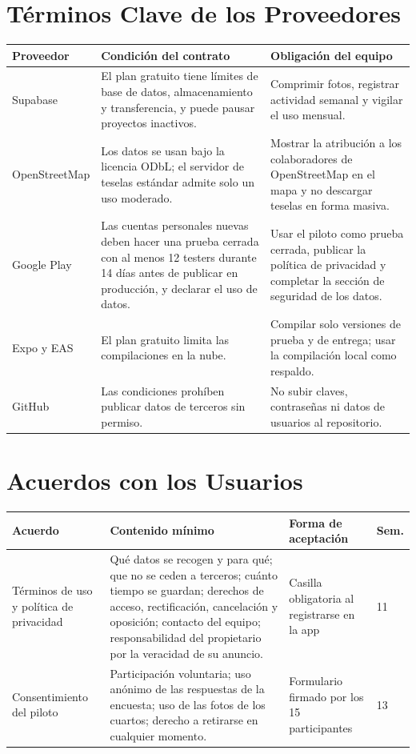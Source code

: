 \documentclass[11pt,a4paper]{article}
\begin{document}
\section{Términos Clave de los Proveedores}
{\small
{}
\noindent\begin{tabularx}{\textwidth}{@{}P{2.6cm} L L@{}}
\toprule
{}
\textbf{Proveedor} & \textbf{Condición del contrato} & \textbf{Obligación del equipo} \\
\midrule
Supabase & El plan gratuito tiene límites de base de datos, almacenamiento y transferencia, y puede pausar proyectos inactivos. & Comprimir fotos, registrar actividad semanal y vigilar el uso mensual. \\
OpenStreetMap & Los datos se usan bajo la licencia ODbL; el servidor de teselas estándar admite solo un uso moderado. & Mostrar la atribución a los colaboradores de OpenStreetMap en el mapa y no descargar teselas en forma masiva. \\
Google Play & Las cuentas personales nuevas deben hacer una prueba cerrada con al menos 12 testers durante 14 días antes de publicar en producción, y declarar el uso de datos. & Usar el piloto como prueba cerrada, publicar la política de privacidad y completar la sección de seguridad de los datos. \\
Expo y EAS & El plan gratuito limita las compilaciones en la nube. & Compilar solo versiones de prueba y de entrega; usar la compilación local como respaldo. \\
GitHub & Las condiciones prohíben publicar datos de terceros sin permiso. & No subir claves, contraseñas ni datos de usuarios al repositorio. \\
\bottomrule
\end{tabularx}
}

\section{Acuerdos con los Usuarios}
{\small
{}
\noindent\begin{tabularx}{\textwidth}{@{}P{3.0cm} L P{2.6cm} C{1.2cm}@{}}
\toprule
{}
\textbf{Acuerdo} & \textbf{Contenido mínimo} & \textbf{Forma de aceptación} & \textbf{Sem.} \\
\midrule
Términos de uso y política de privacidad & Qué datos se recogen y para qué; que no se ceden a terceros; cuánto tiempo se guardan; derechos de acceso, rectificación, cancelación y oposición; contacto del equipo; responsabilidad del propietario por la veracidad de su anuncio. & Casilla obligatoria al registrarse en la app & 11 \\
Consentimiento del piloto & Participación voluntaria; uso anónimo de las respuestas de la encuesta; uso de las fotos de los cuartos; derecho a retirarse en cualquier momento. & Formulario firmado por los 15 participantes & 13 \\
\bottomrule
\end{tabularx}
}
\end{document}

